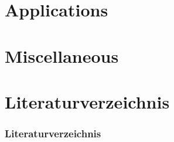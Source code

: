 \documentclass{beamer}
\begin{document}
\section{Applications}


\section{Miscellaneous}



\section{Literaturverzeichnis}
\begin{frame}
\frametitle{Literaturverzeichnis}
{\tiny 

}
\end{frame} 

\end{document}
